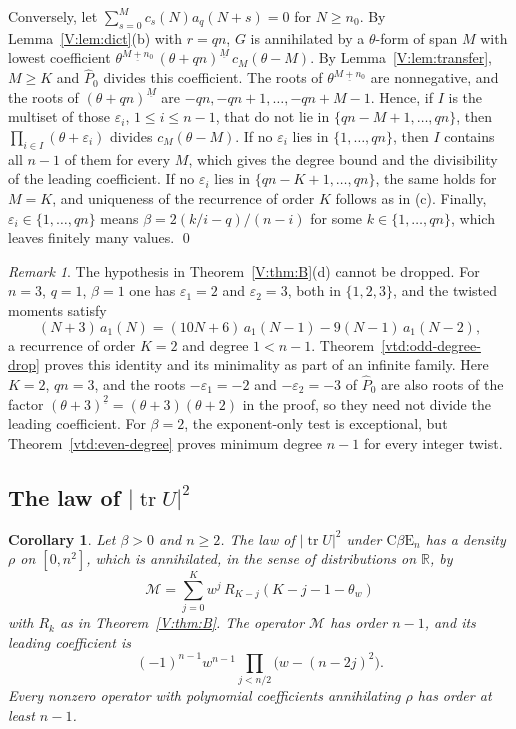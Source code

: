 \documentclass[11pt,a4paper]{article}
\newtheorem{corollary}[theorem]{Corollary}
\theoremstyle{definition}
\theoremstyle{remark}
\newtheorem{remark}[theorem]{Remark}
\newcommand{\R}{\mathbb R}
\newcommand{\ff}[2]{#1^{\underline{#2}}}
\DeclareMathOperator{\tr}{tr}
\numberwithin{equation}{section}
\begin{document}
Conversely, let $\sum_{s=0}^Mc_s(N)a_q(N+s)=0$ for $N\ge n_0$. By Lemma~\ref{V:lem:dict}(b) with $r=qn$, $G$ is annihilated by a $\theta$-form of span $M$ with lowest coefficient $\ff\theta{M+n_0}\,\ff{(\theta+qn)}M\,c_M(\theta-M)$. By Lemma~\ref{V:lem:transfer}, $M\ge K$ and $\hat P_0$ divides this coefficient. The roots of $\ff\theta{M+n_0}$ are nonnegative, and the roots of $\ff{(\theta+qn)}M$ are $-qn,-qn+1,\dots,-qn+M-1$. Hence, if $I$ is the multiset of those $\varepsilon_i$, $1\le i\le n-1$, that do not lie in $\{qn-M+1,\dots,qn\}$, then $\prod_{i\in I}(\theta+\varepsilon_i)$ divides $c_M(\theta-M)$. If no $\varepsilon_i$ lies in $\{1,\dots,qn\}$, then $I$ contains all $n-1$ of them for every $M$, which gives the degree bound and the divisibility of the leading coefficient. If no $\varepsilon_i$ lies in $\{qn-K+1,\dots,qn\}$, the same holds for $M=K$, and uniqueness of the recurrence of order $K$ follows as in (c). Finally, $\varepsilon_i\in\{1,\dots,qn\}$ means $\beta=2(k/i-q)/(n-i)$ for some $k\in\{1,\dots,qn\}$, which leaves finitely many values. \qed

\begin{remark}\label{V:rem:exceptional}
The hypothesis in Theorem~\ref{V:thm:B}(d) cannot be dropped. For $n=3$, $q=1$, $\beta=1$ one has $\varepsilon_1=2$ and $\varepsilon_2=3$, both in $\{1,2,3\}$, and the twisted moments satisfy
\[
(N+3)\,a_1(N)=(10N+6)\,a_1(N-1)-9(N-1)\,a_1(N-2),
\]
a recurrence of order $K=2$ and degree $1<n-1$. Theorem~\ref{vtd:odd-degree-drop} proves this identity and its minimality as part of an infinite family. Here $K=2$, $qn=3$, and the roots $-\varepsilon_1=-2$ and $-\varepsilon_2=-3$ of $\hat P_0$ are also roots of the factor $\ff{(\theta+3)}2=(\theta+3)(\theta+2)$ in the proof, so they need not divide the leading coefficient. For $\beta=2$, the exponent-only test is exceptional, but Theorem~\ref{vtd:even-degree} proves minimum degree $n-1$ for every integer twist.
\end{remark}

\subsection{The law of \texorpdfstring{$|\tr U|^2$}{the squared trace}}

\begin{corollary}\label{V:cor:density}
Let $\beta>0$ and $n\ge2$. The law of $|\tr U|^2$ under $\mathrm{C}\beta\mathrm{E}_n$ has a density $\rho$ on $[0,n^2]$, which is annihilated, in the sense of distributions on $\R$, by
\[
\mathcal M=\sum_{j=0}^{K}w^j\,R_{K-j}(K-j-1-\theta_w)
\]
with $R_k$ as in Theorem~\ref{V:thm:B}. The operator $\mathcal M$ has order $n-1$, and its leading coefficient is
\[
(-1)^{n-1}w^{n-1}\prod_{j<n/2}\bigl(w-(n-2j)^2\bigr).
\] Every nonzero operator with polynomial coefficients annihilating $\rho$ has order at least $n-1$.
\end{corollary}
\end{document}
